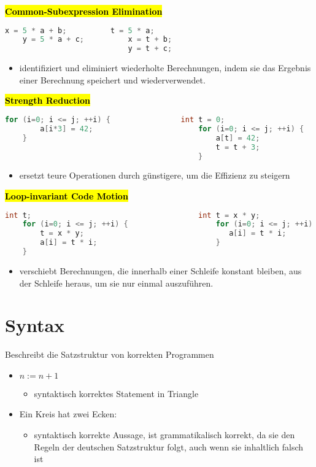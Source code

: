 \documentclass[a4paper, 10pt]{article}
\begin{document}
\noindent\textbf{\hl{Common-Subexpression Elimination}}
\begin{lstlisting}[language = java]
    x = 5 * a + b;          t = 5 * a;
    y = 5 * a + c;          x = t + b;
                            y = t + c; 
\end{lstlisting}
\begin{itemize}
    \item identifiziert und eliminiert wiederholte Berechnungen, indem sie das Ergebnis einer Berechnung speichert und wiederverwendet.
\end{itemize}

\noindent\textbf{\hl{Strength Reduction}}
\begin{lstlisting}[language = java]
    for (i=0; i <= j; ++i) {                int t = 0; 
        a[i*3] = 42;                        for (i=0; i <= j; ++i) {
    }                                           a[t] = 42; 
                                                t = t + 3;
                                            }
\end{lstlisting} 
\begin{itemize}
    \item ersetzt teure Operationen durch günstigere, um die Effizienz zu steigern
\end{itemize}

\noindent\textbf{\hl{Loop-invariant Code Motion}}
\begin{lstlisting}[language = java]
    int t;                                      int t = x * y;
    for (i=0; i <= j; ++i) {                    for (i=0; i <= j; ++i) {
        t = x * y;                                 a[i] = t * i;
        a[i] = t * i;                           }
    }
\end{lstlisting}
\begin{itemize}
    \item verschiebt Berechnungen, die innerhalb einer Schleife konstant bleiben, aus der Schleife heraus, um sie nur einmal auszuführen.
\end{itemize}

\section{Syntax}
Beschreibt die Satzstruktur von korrekten Programmen
\begin{itemize}
    \item $n := n + 1$
    \begin{itemize}
        \item syntaktisch korrektes Statement in Triangle
    \end{itemize}

    \item Ein Kreis hat zwei Ecken:
    \begin{itemize}
        \item syntaktisch korrekte Aussage, ist grammatikalisch korrekt, da sie den Regeln der deutschen Satzstruktur folgt, auch wenn sie inhaltlich falsch ist
    \end{itemize}
 \end{itemize}
\end{document}
